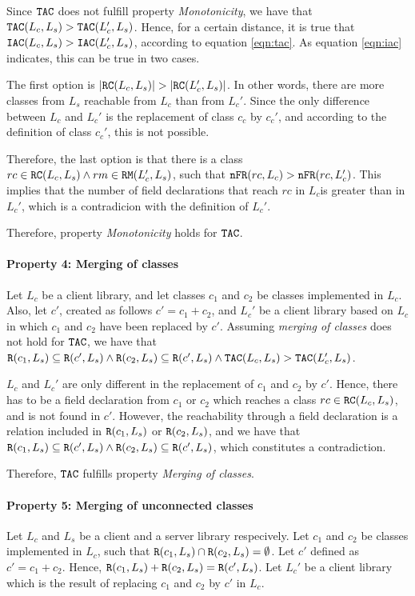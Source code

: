 Since $\verb|TAC|$ does not fulfill property \textit{Monotonicity}, we have that $\verb|TAC|(L_c, L_s) > \verb|TAC|(L_c', L_s)$. Hence, for a certain distance, it is true that $\verb|IAC|(L_c,L_s) > \verb|IAC|(L_c',L_s)$, according to equation \ref{eqn:tac}. As equation \ref{eqn:iac} indicates, this can be true in two cases.

The first option is $|\verb|RC|(L_c,L_s)| > |\verb|RC|(L_c',L_s)|$.
In other words, there are more classes from $L_s$ reachable from $L_c$ than from $L_c'$. Since the only difference between $L_c$ and $L_c'$ is the replacement of class $c_c$ by $c_c'$, and according to the definition of class $c_c'$, this is not possible.

Therefore, the last option is that there is a class $rc \in \verb|RC|(L_c,L_s) \land rm \in \verb|RM|(L_c',L_s)$, such that   $\verb|nFR|(rc,L_c) > \verb|nFR|(rc,L_c')$. This implies that the number of field declarations that reach $rc$ in $L_c$is greater than in $L_c'$, which is a contradicion with the definition of $L_c'$.

Therefore, property \textit{Monotonicity} holds for $\verb|TAC|$.

\paragraph{Property 4: Merging of classes}
Let $L_c$ be a client library, and let classes $c_1$ and $c_2$ be classes implemented in $L_c$. Also, let $c'$, created as follows $c' = c_1 + c_2$, and $L_c'$ be a client library based on $L_c$ in which $c_1$ and $c_2$ have been replaced by $c'$. Assuming \textit{merging of classes} does not hold for $\verb|TAC|$, we have that $\verb|R|(c_1, L_s) \subseteq \verb|R|(c', L_s) \land \verb|R|(c_2, L_s) \subseteq \verb|R|(c', L_s) \land \verb|TAC|(L_c, L_s) > \verb|TAC|(L_c', L_s)$.

$L_c$ and $L_c'$ are only different in the replacement of $c_1$ and $c_2$ by $c'$. Hence, there has to be a field declaration from $c_1$ or $c_2$ which reaches a class $rc \in \verb|RC|(L_c,L_s)$, and is not found in $c'$. However, the reachability through a field declaration is a relation included in $\verb|R|(c_1, L_s)$ or $\verb|R|(c_2, L_s)$, and we have that $\verb|R|(c_1, L_s) \subseteq \verb|R|(c', L_s) \land \verb|R|(c_2, L_s) \subseteq \verb|R|(c', L_s)$, which constitutes a contradiction.

Therefore, $\verb|TAC|$ fulfills property \textit{Merging of classes}.

\paragraph{Property 5: Merging of unconnected classes}
Let $L_c$ and $L_s$ be a client and a server library respecively. Let $c_1$ and $c_2$ be classes implemented in $L_c$, such that $\verb|R|(c_1, L_s) \cap \verb|R|(c_2, L_s) = \emptyset$. Let $c'$ defined as $c' = c_1 + c_2$. Hence, $\verb|R|(c_1, L_s) + \verb|R|(c_2, L_s) = \verb|R|(c', L_s)$. Let $L_c'$ be a client library which is the result of replacing $c_1$ and $c_2$ by $c'$ in $L_c$.

